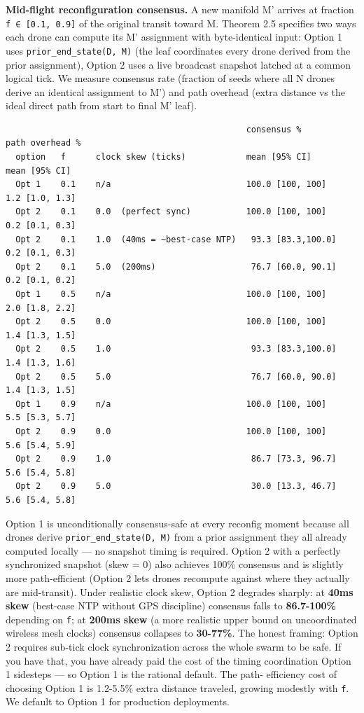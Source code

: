 \textbf{Mid-flight reconfiguration consensus.} A new manifold M' arrives
at fraction \texttt{f\ ∈\ {[}0.1,\ 0.9{]}} of the original transit
toward M. Theorem 2.5 specifies two ways each drone can compute its M'
assignment with byte-identical input: Option 1 uses
\texttt{prior\_end\_state(D,\ M)} (the leaf coordinates every drone
derived from the prior assignment), Option 2 uses a live broadcast
snapshot latched at a common logical tick. We measure consensus rate
(fraction of seeds where all N drones derive an identical assignment to
M') and path overhead (extra distance vs the ideal direct path from
start to final M' leaf).

\begin{verbatim}
                                                consensus %        path overhead %
  option   f      clock skew (ticks)            mean [95% CI]      mean [95% CI]
  Opt 1    0.1    n/a                           100.0 [100, 100]    1.2 [1.0, 1.3]
  Opt 2    0.1    0.0  (perfect sync)           100.0 [100, 100]    0.2 [0.1, 0.3]
  Opt 2    0.1    1.0  (40ms = ~best-case NTP)   93.3 [83.3,100.0]  0.2 [0.1, 0.3]
  Opt 2    0.1    5.0  (200ms)                   76.7 [60.0, 90.1]  0.2 [0.1, 0.2]
  Opt 1    0.5    n/a                           100.0 [100, 100]    2.0 [1.8, 2.2]
  Opt 2    0.5    0.0                           100.0 [100, 100]    1.4 [1.3, 1.5]
  Opt 2    0.5    1.0                            93.3 [83.3,100.0]  1.4 [1.3, 1.6]
  Opt 2    0.5    5.0                            76.7 [60.0, 90.0]  1.4 [1.3, 1.5]
  Opt 1    0.9    n/a                           100.0 [100, 100]    5.5 [5.3, 5.7]
  Opt 2    0.9    0.0                           100.0 [100, 100]    5.6 [5.4, 5.9]
  Opt 2    0.9    1.0                            86.7 [73.3, 96.7]  5.6 [5.4, 5.8]
  Opt 2    0.9    5.0                            30.0 [13.3, 46.7]  5.6 [5.4, 5.8]
\end{verbatim}

Option 1 is unconditionally consensus-safe at every reconfig moment
because all drones derive \texttt{prior\_end\_state(D,\ M)} from a prior
assignment they all already computed locally --- no snapshot timing is
required. Option 2 with a perfectly synchronized snapshot (skew = 0)
also achieves 100\% consensus and is slightly more path-efficient
(Option 2 lets drones recompute against where they actually are
mid-transit). Under realistic clock skew, Option 2 degrades sharply: at
\textbf{40ms skew} (best-case NTP without GPS discipline) consensus
falls to \textbf{86.7-100\%} depending on \texttt{f}; at \textbf{200ms
skew} (a more realistic upper bound on uncoordinated wireless mesh
clocks) consensus collapses to \textbf{30-77\%}. The honest framing:
Option 2 requires sub-tick clock synchronization across the whole swarm
to be safe. If you have that, you have already paid the cost of the
timing coordination Option 1 sidesteps --- so Option 1 is the rational
default. The path- efficiency cost of choosing Option 1 is 1.2-5.5\%
extra distance traveled, growing modestly with \texttt{f}. We default to
Option 1 for production deployments.

